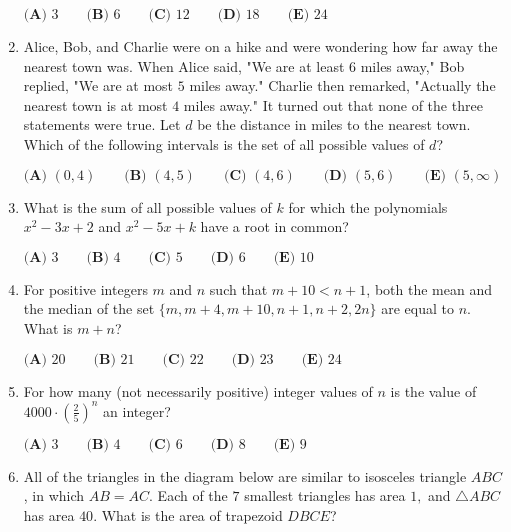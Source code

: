 \documentclass{article}
\begin{document}
\begin{enumerate}[label=\arabic*., itemsep=0.5em]
\(\textbf{(A) }3\qquad\textbf{(B) }6\qquad\textbf{(C) }12\qquad\textbf{(D) }18\qquad\textbf{(E) }24\)\par \vspace{0.5em}\item Alice, Bob, and Charlie were on a hike and were wondering how far away the nearest town was. When Alice said, "We are at least \(6\) miles away," Bob replied, "We are at most \(5\) miles away." Charlie then remarked, "Actually the nearest town is at most \(4\) miles away." It turned out that none of the three statements were true. Let \(d\) be the distance in miles to the nearest town. Which of the following intervals is the set of all possible values of \(d\)?

\(\textbf{(A) }   (0,4)   \qquad        \textbf{(B) }   (4,5)   \qquad    \textbf{(C) }   (4,6)   \qquad   \textbf{(D) }  (5,6)  \qquad  \textbf{(E) }   (5,\infty) \)\par \vspace{0.5em}\item What is the sum of all possible values of \(k\) for which the polynomials \(x^2 - 3x + 2\) and \(x^2 - 5x + k\) have a root in common?

\(\textbf{(A) }3 \qquad\textbf{(B) }4 \qquad\textbf{(C) }5 \qquad\textbf{(D) }6 \qquad\textbf{(E) }10 \qquad\)\par \vspace{0.5em}\item For positive integers \(m\) and \(n\) such that \(m+10<n+1\), both the mean and the median of the set \(\{m, m+4, m+10, n+1, n+2, 2n\}\) are equal to \(n\). What is \(m+n\)?

\(\textbf{(A) }20\qquad\textbf{(B) }21\qquad\textbf{(C) }22\qquad\textbf{(D) }23\qquad\textbf{(E) }24\)\par \vspace{0.5em}\item For how many (not necessarily positive) integer values of \(n\) is the value of \(4000\cdot \left(\tfrac{2}{5}\right)^n\) an integer?

\(
\textbf{(A) }3 \qquad
\textbf{(B) }4 \qquad
\textbf{(C) }6 \qquad
\textbf{(D) }8 \qquad
\textbf{(E) }9 \qquad
\)\par \vspace{0.5em}\item All of the triangles in the diagram below are similar to isosceles triangle \(ABC\), in which \(AB=AC\). Each of the \(7\) smallest triangles has area \(1,\) and \(\triangle ABC\) has area \(40\). What is the area of trapezoid \(DBCE\)?



\end{enumerate}
\end{document}
